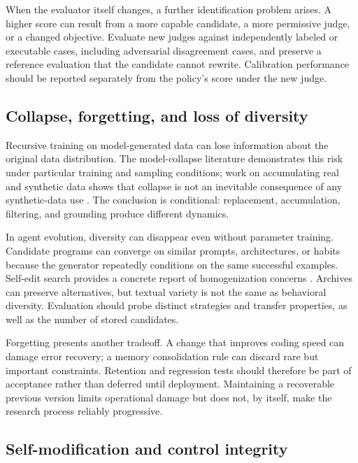 \documentclass[11pt,american,]{article}
\begin{document}
When the evaluator itself changes, a further identification problem
arises. A higher score can result from a more capable candidate, a more
permissive judge, or a changed objective. Evaluate new judges against
independently labeled or executable cases, including adversarial
disagreement cases, and preserve a reference evaluation that the
candidate cannot rewrite. Calibration performance should be reported
separately from the policy's score under the new judge.

\hypertarget{collapse-forgetting-and-loss-of-diversity}{%
\subsection{Collapse, forgetting, and loss of
diversity}\label{collapse-forgetting-and-loss-of-diversity}}

Recursive training on model-generated data can lose information about
the original data distribution. The model-collapse literature
demonstrates this risk under particular training and sampling
conditions; work on accumulating real and synthetic data shows that
collapse is not an inevitable consequence of any synthetic-data use
\citep{collapse2023, accumulate2024}. The conclusion is conditional:
replacement, accumulation, filtering, and grounding produce different
dynamics.

In agent evolution, diversity can disappear even without parameter
training. Candidate programs can converge on similar prompts,
architectures, or habits because the generator repeatedly conditions on
the same successful examples. Self-edit search provides a concrete
report of homogenization concerns \citep{selfedit2026}. Archives can
preserve alternatives, but textual variety is not the same as behavioral
diversity. Evaluation should probe distinct strategies and transfer
properties, as well as the number of stored candidates.

Forgetting presents another tradeoff. A change that improves coding
speed can damage error recovery; a memory consolidation rule can discard
rare but important constraints. Retention and regression tests should
therefore be part of acceptance rather than deferred until deployment.
Maintaining a recoverable previous version limits operational damage but
does not, by itself, make the research process reliably progressive.

\hypertarget{self-modification-and-control-integrity}{%
\subsection{Self-modification and control
integrity}\label{self-modification-and-control-integrity}}
\end{document}
